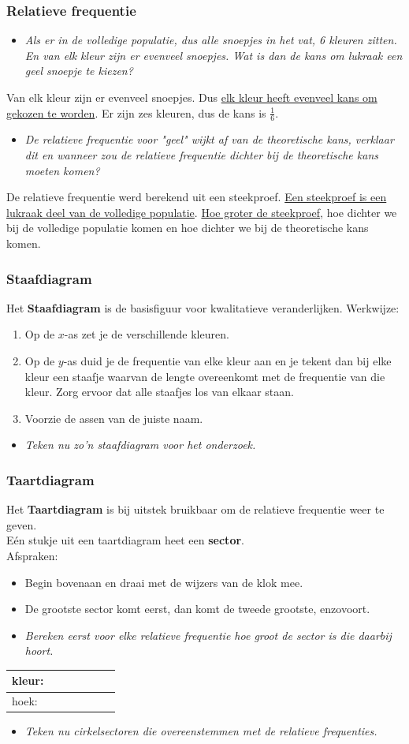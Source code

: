 \documentclass[dutch]{beamer}
\newcommand{\vraag}[1]{\begin{itemize}\item[Vraag:] {\it #1}\end{itemize}}
\begin{document}
\begin{frame}
\frametitle{Relatieve frequentie}
\vraag{Als er in de volledige populatie, dus alle snoepjes in het vat, 6 kleuren zitten. En
van elk kleur zijn er evenveel snoepjes. Wat is dan de kans om lukraak een geel snoepje te kiezen?}
\pause
Van elk kleur zijn er evenveel snoepjes. Dus \uline{elk kleur heeft evenveel kans om gekozen te worden}. Er zijn zes kleuren, dus de kans is $\frac{1}{6}$.
\pause
\vraag{De relatieve frequentie voor "geel" wijkt af van de theoretische kans, verklaar dit en wanneer
zou de relatieve frequentie dichter bij de theoretische kans moeten komen?}
\pause
De relatieve frequentie werd berekend uit een steekproef. \uline{Een steekproef is een lukraak deel van de volledige populatie}. \uline{Hoe groter de steekproef}, hoe dichter we bij de volledige populatie komen en hoe dichter we bij de theoretische kans komen.
\end{frame}

\begin{frame}
\frametitle{Staafdiagram}
Het {\bf Staafdiagram} is de basisfiguur voor kwalitatieve veranderlijken.
Werkwijze:
\begin{enumerate}
  \item Op de $x$-as zet je de verschillende kleuren.
\item Op de $y$-as duid je de frequentie van elke kleur aan en je tekent dan bij elke kleur een staafje
waarvan de lengte overeenkomt met de frequentie van die kleur. Zorg ervoor dat alle staafjes
los van elkaar staan.
\item Voorzie de assen van de juiste naam.
\end{enumerate}
\pause
\vraag{Teken nu zo’n staafdiagram voor het onderzoek.}
\end{frame}


\begin{frame}
\frametitle{Taartdiagram}
Het {\bf Taartdiagram} is bij uitstek bruikbaar om de relatieve frequentie weer te geven.\\
Eén stukje uit een taartdiagram heet een {\bf sector}.\\
Afspraken:
\begin{itemize}
  \item Begin bovenaan en draai met de wijzers van de klok mee.
  \item De grootste sector komt eerst, dan komt de tweede
grootste, enzovoort.
\end{itemize}
\pause
\vraag{Bereken eerst voor elke relatieve frequentie hoe groot de sector is die daarbij hoort.}
\begin{center}
  \begin{tabular}{|p{1cm}|p{1cm}|p{1cm}|p{1cm}|p{1cm}|p{1cm}|p{1cm}|}
    \hline
    kleur:\vspace{0.5cm}&&&&&&\\
    \hline
    hoek:\vspace{0.5cm}&&&&&&\\
    \hline
  \end{tabular}
\end{center}
\pause
\vraag{Teken nu cirkelsectoren die overeenstemmen met de relatieve frequenties.}
\end{frame}
\end{document}
